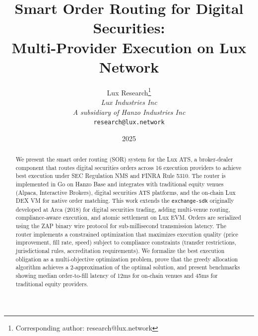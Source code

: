 \documentclass[11pt,a4paper]{article}
\title{Smart Order Routing for Digital Securities:\\Multi-Provider Execution on Lux Network}
\author{
Lux Research\thanks{Corresponding author: research@lux.network}\\
\textit{Lux Industries Inc}\\
\textit{A subsidiary of Hanzo Industries Inc}\\
\texttt{research@lux.network}
}
\date{2025}
\begin{document}
\luxcoverpage

\begin{abstract}
We present the smart order routing (SOR) system for the Lux ATS, a broker-dealer component that routes digital securities orders across 16 execution providers to achieve best execution under SEC Regulation NMS and FINRA Rule 5310. The router is implemented in Go on Hanzo Base and integrates with traditional equity venues (Alpaca, Interactive Brokers), digital securities ATS platforms, and the on-chain Lux DEX VM for native order matching. This work extends the \texttt{exchange-sdk} originally developed at Arca (2018) for digital securities trading, adding multi-venue routing, compliance-aware execution, and atomic settlement on Lux EVM. Orders are serialized using the ZAP binary wire protocol for sub-millisecond transmission latency. The router implements a constrained optimization that maximizes execution quality (price improvement, fill rate, speed) subject to compliance constraints (transfer restrictions, jurisdictional rules, accreditation requirements). We formalize the best execution obligation as a multi-objective optimization problem, prove that the greedy allocation algorithm achieves a 2-approximation of the optimal solution, and present benchmarks showing median order-to-fill latency of 12ms for on-chain venues and 45ms for traditional equity providers.
\end{abstract}













\end{document}

